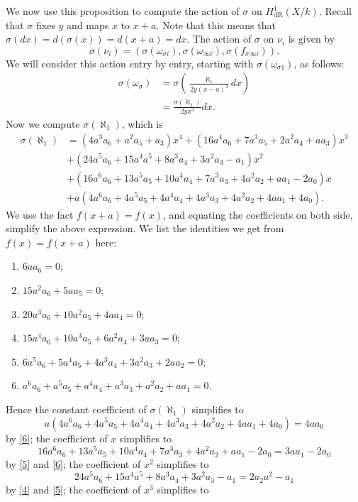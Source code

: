 \documentclass[draft, 11pt]{article} %
\theoremstyle{plain}
\theoremstyle{remark}
\newcommand{\derhamhone}{H_{\text {dR}}^1(X/k)}
\begin{document}
We now use this proposition to compute the action of $\sigma $ on $\derhamhone$.
Recall that $\sigma$ fixes $y$ and maps $x$ to $x+a$. 
Note that this means that $\sigma(dx) = d(\sigma(x)) = d(x+a) = dx$.
The action of $\sigma$ on $\nu_i$ is given by
\begin{equation*}
\sigma(\nu_i) = \left( \sigma( \omega_{\sigma i}), \sigma(\omega_{\infty i}), \sigma( f_{\sigma \infty i})\right).
\end{equation*}
We will consider this action entry by entry, starting with $\sigma(\omega_{\sigma 1})$, as follows:
\begin{align*}
\sigma( \omega_{\sigma}) & = \sigma \left( \frac{\aleph_1}{2y(x-a)^3} dx \right) \\
& = \frac{\sigma(\aleph_1)}{2yx^3}dx.
\end{align*}
Now we compute $\sigma(\aleph_1)$, which is
\begin{align*}
\sigma(\aleph_1) & = (4a^3a_6+a^2a_5+a_3)x^4 + (16a^4a_6+7a^3a_5+2a^2a_4+aa_3)x^3 \\
& + (24a^5a_6+15a^4a^5+8a^3a_4+3a^2a_3-a_1)x^2 \\
& + (16a^6a_6+13a^5a_5+10a^4a_4+7a^3a_3+4a^2a_2+aa_1-2a_0)x \\
& + a(4a^6a_6+4a^5a_5+4a^4a_4+4a^3a_3+4a^2a_2+4aa_1+4a_0).
\end{align*}
We use the fact $f(x+a) = f(x)$, and equating the coefficients on both side, simplify the above expression.
We list the identities we get from $f(x) = f(x+a)$ here:
\begin{enumerate}
\item \label{1} $6aa_6=0$;
\item \label{2} $15a^2a_6+5aa_5 = 0$;
\item \label{3} $20a^3a_6+10a^2a_5+4aa_4 = 0$;
\item \label{4} $15a^4a_6 + 10a^3a_5 + 6a^2a_4+3aa_3= 0$;
\item \label{5} $6a^5a_6 + 5a^4a_5+4a^3a_4+3a^2a_3+2aa_2= 0$;
\item \label{6} $a^6a_6+a^5a_5+a^4a_4+a^3a_3+a^2a_2+aa_1 = 0$.
\end{enumerate}
Hence the constant coefficient of $\sigma (\aleph_1)$ simplifies to
\begin{equation*}
 a(4a^6a_6+4a^5a_5+4a^4a_4+4a^3a_3+4a^2a_2+4aa_1+4a_0) =  4aa_0
\end{equation*}
by \ref{6}; the coefficient of $x$ simplifies to
\[
16a^6a_6+13a^5a_5+10a^4a_4+7a^3a_3+4a^2a_2+aa_1-2a_0 = 3aa_1 -2a_0
\]
by \ref{5} and \ref{6}; the coefficient of $x^2$ simplifies to 
\[
24a^5a_6+15a^4a^5+8a^3a_4+3a^2a_3-a_1 = 2a_2a^2-a_1
\]
by \ref{4} and \ref{5}; the coefficient of $x^3$ simplifies to 
\end{document}
